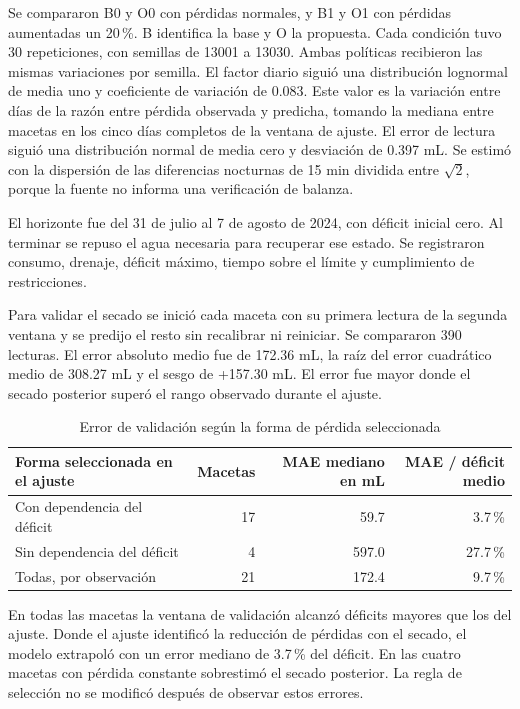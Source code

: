 \documentclass[12pt]{article}
\begin{document}
Se compararon B0 y O0 con pérdidas normales, y B1 y O1 con pérdidas aumentadas un 20\,\%. B identifica la base y O la propuesta. Cada condición tuvo 30 repeticiones, con semillas de 13001 a 13030. Ambas políticas recibieron las mismas variaciones por semilla. El factor diario siguió una distribución lognormal de media uno y coeficiente de variación de 0.083. Este valor es la variación entre días de la razón entre pérdida observada y predicha, tomando la mediana entre macetas en los cinco días completos de la ventana de ajuste. El error de lectura siguió una distribución normal de media cero y desviación de 0.397 mL. Se estimó con la dispersión de las diferencias nocturnas de 15 min dividida entre $\sqrt{2}$, porque la fuente no informa una verificación de balanza.

El horizonte fue del 31 de julio al 7 de agosto de 2024, con déficit inicial cero. Al terminar se repuso el agua necesaria para recuperar ese estado. Se registraron consumo, drenaje, déficit máximo, tiempo sobre el límite y cumplimiento de restricciones.

Para validar el secado se inició cada maceta con su primera lectura de la segunda ventana y se predijo el resto sin recalibrar ni reiniciar. Se compararon 390 lecturas. El error absoluto medio fue de 172.36 mL, la raíz del error cuadrático medio de 308.27 mL y el sesgo de +157.30 mL. El error fue mayor donde el secado posterior superó el rango observado durante el ajuste.

\begin{table}[H]
\centering
\caption{Error de validación según la forma de pérdida seleccionada}
\small
\begin{tabularx}{\textwidth}{|X|r|r|r|}
\hline
Forma seleccionada en el ajuste & Macetas & MAE mediano en mL & MAE / déficit medio \\
\hline
Con dependencia del déficit & 17 & 59.7 & 3.7\,\% \\
\hline
Sin dependencia del déficit & 4 & 597.0 & 27.7\,\% \\
\hline
Todas, por observación & 21 & 172.4 & 9.7\,\% \\
\hline
\end{tabularx}
\end{table}

En todas las macetas la ventana de validación alcanzó déficits mayores que los del ajuste. Donde el ajuste identificó la reducción de pérdidas con el secado, el modelo extrapoló con un error mediano de 3.7\,\% del déficit. En las cuatro macetas con pérdida constante sobrestimó el secado posterior. La regla de selección no se modificó después de observar estos errores.
\end{document}
